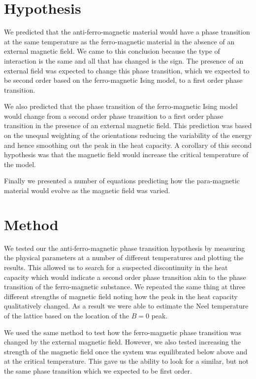 \documentclass[a4paper, twocolumn]{article}
\begin{document}
\section*{Hypothesis}
We predicted that the anti-ferro-magnetic material would have a phase %
transition at the same temperature as the ferro-magnetic material in %
the absence of an external magnetic field. We came to this conclusion %
because the type of interaction is the same and all that has changed is %
the sign. The presence of an external field was expected to change %
this phase transition, which we expected to be second order based on %
the ferro-magnetic Ising model, to a first order phase transition. 


We also predicted that the phase transition of the ferro-magnetic %
Ising model would change from a second order phase transition to a first %
order phase transition in the presence of an external magnetic field. %
This prediction was based on the unequal weighting of the orientations %
reducing the variability of the energy and hence smoothing out the %
peak in the heat capacity. A corollary of this second hypothesis was %
that the magnetic field would increase the critical temperature of %
the model. 


Finally we presented a number of equations predicting how the %
para-magnetic material would evolve as the magnetic field was varied. %


\section*{Method}
We tested our the anti-ferro-magnetic phase transition hypothesis by %
measuring the physical parameters at a number of different temperatures %
and plotting the results. This allowed us to search for a suspected %
discontinuity in the heat capacity which would indicate a second order %
phase transition akin to the phase transition of the ferro-magnetic %
substance. We repeated the same thing at three different strengths of %
magnetic field noting how the peak in the heat capacity qualitatively %
changed. As a result we were able to estimate the Neel temperature of %
the lattice based on the location of the \(B = 0\) peak.


We used the same method to test how the ferro-magnetic phase transition %
was changed by the external magnetic field. However, we also tested %
increasing the strength of the magnetic field once the system was %
equilibrated below above and at the critical temperature. This gave %
us the ability to look for a similar, but not the same phase transition %
which we expected to be first order. 
\end{document}
